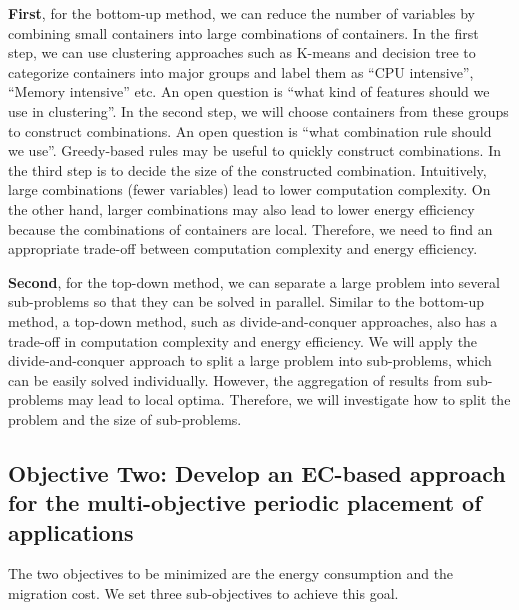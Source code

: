 \begin{itemize}
	 \textbf{First}, for the bottom-up method, we can reduce the number of variables by combining small containers
	into large combinations of containers. In the first step, we can use clustering approaches such as K-means \cite{Xie:2011fj} and decision tree to categorize containers into major groups and label them as ``CPU intensive'', ``Memory intensive'' etc. An open question is ``what kind of features should we use in clustering''.  In the second step, we will choose containers from these groups to construct combinations. An open question is ``what combination rule should we use''. Greedy-based rules may be useful to quickly construct combinations. In the third step is to decide the size of the constructed combination. Intuitively, large combinations (fewer variables) lead to lower computation complexity. On the other hand, larger combinations may also lead to lower energy efficiency because the combinations of containers are local. Therefore, we need to find an appropriate trade-off between computation complexity and energy efficiency. 

	\textbf{Second}, for the top-down method, we can separate a large problem into several sub-problems so that they can be solved in parallel. Similar to the bottom-up method, a top-down method, such as divide-and-conquer approaches, also has a trade-off in computation complexity and energy efficiency. We will apply the divide-and-conquer \cite{Bentley:1980dz} approach to split a large problem into sub-problems, which can be easily solved individually. However, the aggregation of results from sub-problems may lead to local optima.  Therefore, we will investigate how to split the problem and the size of sub-problems. 




\end{itemize}
\subsection{Objective Two: Develop an EC-based approach for the multi-objective periodic placement of applications}
 The two objectives to be minimized are the energy consumption and the migration cost.
We set three sub-objectives to achieve this goal. 

